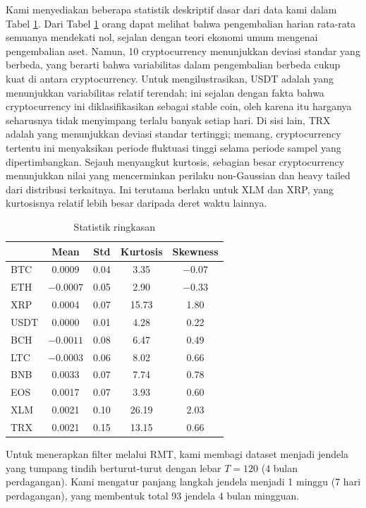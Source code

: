 \documentclass[12pt,a4paper]{article}
\begin{document}
Kami menyediakan beberapa statistik deskriptif dasar dari data kami dalam Tabel \ref{tab:summary}. Dari Tabel \ref{tab:summary} orang dapat melihat bahwa pengembalian harian rata-rata semuanya mendekati nol, sejalan dengan teori ekonomi umum mengenai pengembalian aset. Namun, 10 cryptocurrency menunjukkan deviasi standar yang berbeda, yang berarti bahwa variabilitas dalam pengembalian berbeda cukup kuat di antara cryptocurrency. Untuk mengilustrasikan, USDT adalah yang menunjukkan variabilitas relatif terendah; ini sejalan dengan fakta bahwa cryptocurrency ini diklasifikasikan sebagai stable coin, oleh karena itu harganya seharusnya tidak menyimpang terlalu banyak setiap hari. Di sisi lain, TRX adalah yang menunjukkan deviasi standar tertinggi; memang, cryptocurrency tertentu ini menyaksikan periode fluktuasi tinggi selama periode sampel yang dipertimbangkan. Sejauh menyangkut kurtosis, sebagian besar cryptocurrency menunjukkan nilai yang mencerminkan perilaku non-Gaussian dan heavy tailed dari distribusi terkaitnya. Ini terutama berlaku untuk XLM dan XRP, yang kurtosisnya relatif lebih besar daripada deret waktu lainnya.

\begin{table}[H]
\centering
\caption{Statistik ringkasan}
\label{tab:summary}
\begin{tabular}{lcccc}
\toprule
 & Mean & Std & Kurtosis & Skewness \\
\midrule
BTC & 0.0009 & 0.04 & 3.35 & $-0.07$ \\
ETH & $-0.0007$ & 0.05 & 2.90 & $-0.33$ \\
XRP & 0.0004 & 0.07 & 15.73 & 1.80 \\
USDT & 0.0000 & 0.01 & 4.28 & 0.22 \\
BCH & $-0.0011$ & 0.08 & 6.47 & 0.49 \\
LTC & $-0.0003$ & 0.06 & 8.02 & 0.66 \\
BNB & 0.0033 & 0.07 & 7.74 & 0.78 \\
EOS & 0.0017 & 0.07 & 3.93 & 0.60 \\
XLM & 0.0021 & 0.10 & 26.19 & 2.03 \\
TRX & 0.0021 & 0.15 & 13.15 & 0.66 \\
\bottomrule
\end{tabular}
\end{table}

Untuk menerapkan filter melalui RMT, kami membagi dataset menjadi jendela yang tumpang tindih berturut-turut dengan lebar $T = 120$ (4 bulan perdagangan). Kami mengatur panjang langkah jendela menjadi 1 minggu (7 hari perdagangan), yang membentuk total 93 jendela 4 bulan mingguan.
\end{document}
